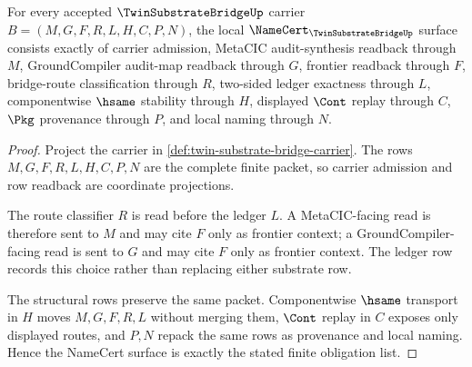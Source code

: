 \begin{theorem}
\label{thm:twin-substrate-bridge-namecert-obligations}
For every accepted $\TwinSubstrateBridgeUp$ carrier $B=(M,G,F,R,L,H,C,P,N)$, the local $\NameCert_{\TwinSubstrateBridgeUp}$ surface consists exactly of carrier admission, MetaCIC audit-synthesis readback through $M$, GroundCompiler audit-map readback through $G$, frontier readback through $F$, bridge-route classification through $R$, two-sided ledger exactness through $L$, componentwise $\hsame$ stability through $H$, displayed $\Cont$ replay through $C$, $\Pkg$ provenance through $P$, and local naming through $N$.
\end{theorem}
\begin{proof}
Project the carrier in \autoref{def:twin-substrate-bridge-carrier}. The rows $M,G,F,R,L,H,C,P,N$ are the complete finite packet, so carrier admission and row readback are coordinate projections.

The route classifier $R$ is read before the ledger $L$. A MetaCIC-facing read is therefore sent to $M$ and may cite $F$ only as frontier context; a GroundCompiler-facing read is sent to $G$ and may cite $F$ only as frontier context. The ledger row records this choice rather than replacing either substrate row.

The structural rows preserve the same packet. Componentwise $\hsame$ transport in $H$ moves $M,G,F,R,L$ without merging them, $\Cont$ replay in $C$ exposes only displayed routes, and $P,N$ repack the same rows as provenance and local naming. Hence the NameCert surface is exactly the stated finite obligation list.
\end{proof}

